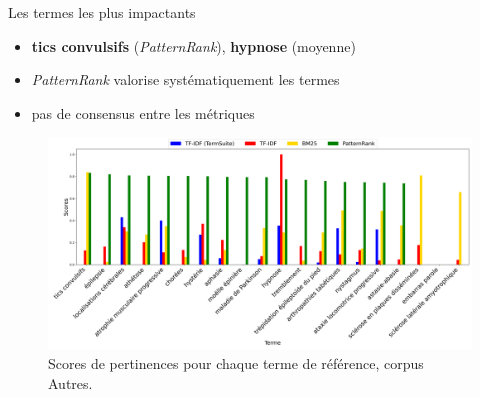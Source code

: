 \begin{frame}{Les termes les plus impactants}
	\begin{itemize}
		\item  \textbf{tics convulsifs} (\textit{PatternRank}), \textbf{hypnose} (moyenne)
		\item \textit{PatternRank} valorise systématiquement les termes
		\item pas de consensus entre les métriques
	\end{itemize}
	\begin{figure}[h]
		\centering
		\includegraphics[width=\linewidth]{pic/termes_viz.png}
		\caption{Scores de pertinences pour chaque terme de référence, corpus \og{}Autres\fg{}.}
		\label{fig:ling_out_TAL}
	\end{figure}
\end{frame}



%

